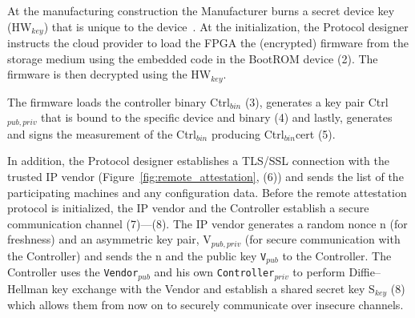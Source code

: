   At the manufacturing construction the Manufacturer burns a secret device key (HW$_{key}$) that is unique to the device~\cite{secure_FPGAs}. At the \projecttitle{} initialization, the Protocol designer instructs the cloud provider to load the FPGA the (encrypted) firmware from the storage medium using the embedded code in the BootROM device (2). The firmware is then decrypted using the HW$_{key}$.  %

The firmware loads the controller binary Ctrl$_{bin}$ (3), generates a key pair Ctrl$_{pub, priv}$ that is bound to the specific device and binary (4) and lastly, generates and signs the measurement of the Ctrl$_{bin}$ producing Ctrl$_{bin}$cert (5). %

In addition, the Protocol designer establishes a TLS/SSL connection with the trusted IP vendor (Figure~\ref{fig:remote_attestation}, (6))  and sends the list of the participating machines and any configuration data. Before the remote attestation protocol is initialized, the IP vendor and the Controller establish a secure communication channel (7)---(8). The IP vendor generates a random nonce n (for freshness) and an asymmetric key pair, V$_{pub, priv}$ (for secure communication with the Controller) and  sends the n and the public key \texttt{V}$_{pub}$ to the Controller. The Controller uses the \texttt{Vendor}$_{pub}$ and his own \texttt{Controller}$_{priv}$ to perform Diffie–Hellman key exchange with the Vendor and establish a shared secret key S$_{key}$ (8) which allows them from now on to securely communicate over insecure channels.

